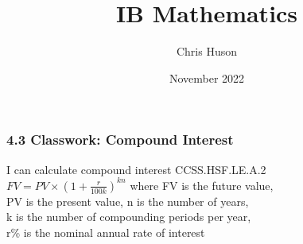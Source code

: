

\title{IB Mathematics}
\author{Chris Huson}
\date{November 2022} %

\fancyhead[LE]{\thepage}



\subsubsection*{4.3 Classwork: Compound Interest}
I can calculate compound interest \hfill CCSS.HSF.LE.A.2 \\[0.5cm]
$\displaystyle FV=PV \times \left(1+\frac{r}{100k} \right)^{kn}$
where FV is the future value,\\[0.25cm]
PV is the present value, n is the number of years, \\
 k is the number of compounding periods per year, \\
 r\% is the nominal annual rate of interest

